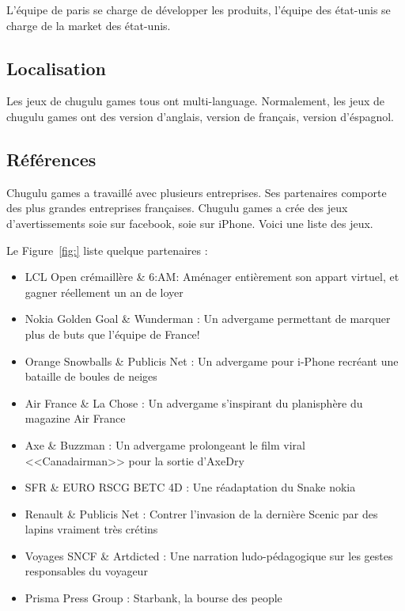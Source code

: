 
L'équipe de paris se charge de développer les produits, l'équipe des état-unis se charge de la market des état-unis. 


\subsection{Localisation} %
\label{ssub:subsubsection_name}

Les jeux de chugulu games tous ont multi-language. Normalement, les jeux de chugulu games ont des version d'anglais, version de français, version d'éspagnol. 


\subsection{Références} %
\label{ssub:références}

Chugulu games a travaillé avec plusieurs entreprises. Ses partenaires comporte des plus grandes entreprises françaises. Chugulu games a crée des jeux d'avertissements soie sur facebook, soie sur iPhone. Voici une liste des jeux.

Le Figure~\ref{fig:} liste quelque partenaires : 




\begin{itemize}
	\item LCL Open crémaillère \& 6:AM: Aménager entièrement son appart virtuel, et gagner réellement un an de loyer 
	\item Nokia Golden Goal \& Wunderman : Un advergame permettant de marquer plus de buts que l'équipe de France!
	\item Orange Snowballs \& Publicis Net : Un advergame pour i-Phone recréant une bataille de boules de neiges
	\item Air France \& La Chose : Un advergame s'inspirant du planisphère du magazine Air France
	\item Axe \& Buzzman : Un advergame prolongeant le film viral <<Canadairman>> pour la sortie d'AxeDry
	\item SFR \& EURO RSCG BETC 4D : Une réadaptation du Snake nokia 
	\item Renault \& Publicis Net : Contrer l'invasion de la dernière Scenic par des lapins vraiment très crétins
	\item Voyages SNCF \& Artdicted : Une narration ludo-pédagogique sur les gestes responsables du voyageur
	\item Prisma Press Group : Starbank, la bourse des people 
\end{itemize}

